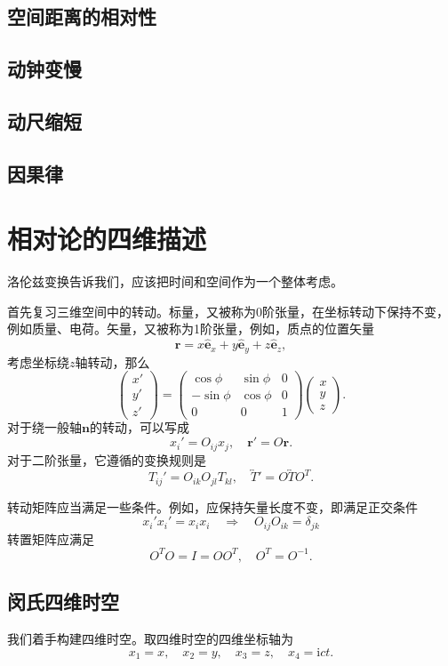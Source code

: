 \documentclass[UTF8]{ctexbook}
\renewcommand{\b}{\boldsymbol}
\renewcommand{\i}{\mathrm{i}}
\renewcommand{\t}{\overleftrightarrow}
\numberwithin{equation}{chapter}
\begin{document}
	\subsection{空间距离的相对性}
	
	\subsection{动钟变慢}
	
	\subsection{动尺缩短}
	
	\subsection{因果律}
	
	\section{相对论的四维描述}
	洛伦兹变换告诉我们，应该把时间和空间作为一个整体考虑。
	
	首先复习三维空间中的转动。标量，又被称为0阶张量，在坐标转动下保持不变，例如质量、电荷。矢量，又被称为1阶张量，例如，质点的位置矢量
	\[\b{r}=x\hat{\b{e}}_x+y\hat{\b{e}}_y+z\hat{\b{e}}_z,\]
	考虑坐标绕$z$轴转动，那么
	\[\begin{pmatrix} x' \\ y' \\ z' \end{pmatrix} = \begin{pmatrix} \cos\phi & \sin \phi & 0 \\ -\sin\phi & \cos\phi & 0 \\ 0 & 0 & 1\end{pmatrix}\begin{pmatrix} x \\ y \\ z \end{pmatrix}.\]
	对于绕一般轴$\b{n}$的转动，可以写成
	\[x_i'=O_{ij}x_j,\quad \b{r}'=O\b{r}.\]
	对于二阶张量，它遵循的变换规则是
	\[T_{ij}'=O_{ik}O_{jl}T_{kl},\quad \t{T}'=O\t{T}O^T	.\]
	
	转动矩阵应当满足一些条件。例如，应保持矢量长度不变，即满足正交条件
	\[x_i'x_i'=x_ix_i\quad \Rightarrow \quad O_{ij}O_{ik}=\delta_{jk}\]
	转置矩阵应满足
	\[O^TO=I=OO^T,\quad O^T=O^{-1}.\]
	
	\subsection{闵氏四维时空}
	我们着手构建四维时空。取四维时空的四维坐标轴为
	\[x_1=x,\quad x_2=y,\quad x_3=z,\quad x_4=\i ct.\]
	
\end{document}
